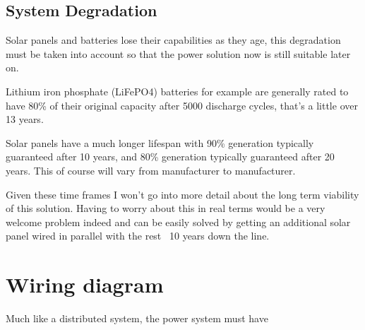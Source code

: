 \subsection{System Degradation}
Solar panels and batteries lose their capabilities as they age, this degradation must be taken into account so that the power solution now is still suitable later on.

Lithium iron phosphate (LiFePO4) batteries for example are generally rated to have 80\% of their original capacity after 5000 discharge cycles, that's a little over 13 years.

Solar panels have a much longer lifespan with 90\% generation typically guaranteed after 10 years, and 80\% generation typically guaranteed after 20 years. This of course will vary from manufacturer to manufacturer. 

Given these time frames I won't go into more detail about the long term viability of this solution. Having to worry about this in real terms would be a very welcome problem indeed and can be easily solved by getting an additional solar panel wired in parallel with the rest ~10 years down the line.


\section{Wiring diagram}

Much like a distributed system, the power system must have 